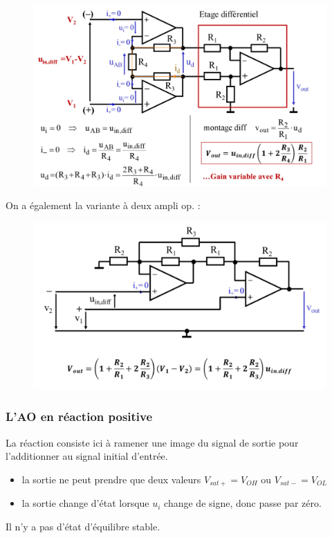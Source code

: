 \documentclass[../main.tex]{subfiles}
\begin{document}
\begin{figure}[hbt!]
    \centering
    \includegraphics[width=.6\textwidth]{IMAGES/elec/IMG_0142.jpeg}
\end{figure}

On a également la variante à deux ampli op. : \\

\begin{figure}[hbt!]
    \centering
    \includegraphics[width=.6\textwidth]{IMAGES/elec/IMG_0143.jpeg}
\end{figure}

\subsubsection{L'AO en réaction positive}

La réaction consiste ici à ramener une image du signal de sortie pour l'additionner au signal initial d'entrée.\\

\begin{itemize}
    \item la sortie ne peut prendre que deux valeurs $V_{sat+} = V_{OH}$ ou $V_{sat-} = V_{OL}$\\
    \item la sortie change d'état lorsque $u_i$ change de signe, donc passe par zéro.\\
\end{itemize}

\warning Il n'y a pas d'état d'équilibre stable.\\
\end{document}
